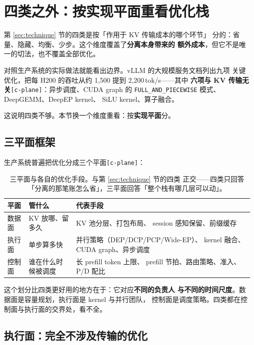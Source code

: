 \section{四类之外：按实现平面重看优化栈}
\label{sec:plane}

第 \ref{sec:technique} 节的四类是按「作用于 KV 传输成本的哪个环节」
分的：省量、隐藏、均衡、少步。这个维度覆盖了\textbf{分离本身带来的
额外成本}，但它不是唯一的切法，也不覆盖全部优化。

对照生产系统的实际做法就能看出边界。vLLM 的大规模服务文档列出九项
关键优化，把每 H200 的吞吐从约 1{,}500 提到 2{,}200\,tok/s——其中
\textbf{六项与 KV 传输无关}\texttt{[c-plane]}：异步调度、CUDA graph 的
\texttt{FULL\_AND\_PIECEWISE} 模式、DeepGEMM、DeepEP kernel、
SiLU kernel、算子融合。

这说明四类不够。本节换一个维度重看：按\textbf{实现平面}分。

\subsection{三平面框架}

生产系统普遍把优化分成三个平面\texttt{[c-plane]}：

\begin{table}[t]
\centering
\caption{三平面与各自的优化手段。与第 \ref{sec:technique} 节的四类
正交——四类只回答「分离的那笔账怎么省」，三平面回答「整个栈有哪几层可以动」。}
\label{tab:plane}
\small
\setlength{\tabcolsep}{9pt}
\begin{tabular}{@{}p{2.5cm}p{5.32cm}p{7.81cm}@{}}
\toprule
平面 & 管什么 & 代表手段 \\
\midrule
数据面 & KV 放哪、留多久 & KV 池分层、打包布局、
  session 感知保留、前缀缓存 \\
执行面 & 单步算多快 & 并行策略（DEP/DCP/PCP/Wide-EP）、
  kernel 融合、CUDA graph、异步调度 \\
控制面 & 谁在什么时候被调度 & 长 prefill token 上限、
  prefill 节拍、路由策略、准入、P/D 配比 \\
\bottomrule
\end{tabular}
\end{table}

\noindent 这个划分比四类更好用的地方在于：它对应\textbf{不同的负责人
与不同的时间尺度}。数据面是容量规划，执行面是 kernel 与并行团队，
控制面是调度策略。四类都在控制面与执行面的交界处，看不全。

\subsection{执行面：完全不涉及传输的优化}

